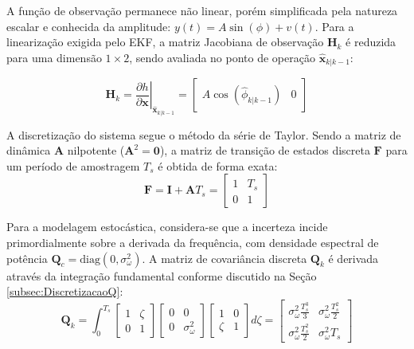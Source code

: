 \documentclass[a4paper,12pt]{article}
\begin{document}
A função de observação permanece não linear, porém simplificada pela natureza escalar e conhecida da amplitude: $y(t) = A\sin(\phi) + v(t)$. Para a linearização exigida pelo EKF, a matriz Jacobiana de observação $\mathbf{H}_k$ é reduzida para uma dimensão $1 \times 2$, sendo avaliada no ponto de operação $\hat{\mathbf{x}}_{k|k-1}$:

\begin{equation}
    \mathbf{H}_k = \left. \frac{\partial h}{\partial \mathbf{x}} \right|_{\hat{\mathbf{x}}_{k|k-1}} = \begin{bmatrix} A \cos(\hat{\phi}_{k|k-1}) & 0 \end{bmatrix}
    \label{eq:mod3_H_jacobiana}
\end{equation}

A discretização do sistema segue o método da série de Taylor. Sendo a matriz de dinâmica $\mathbf{A}$ nilpotente ($\mathbf{A}^2 = \mathbf{0}$), a matriz de transição de estados discreta $\mathbf{F}$ para um período de amostragem $T_s$ é obtida de forma exata:
\begin{equation}
    \mathbf{F} = \mathbf{I} + \mathbf{A}T_s = \begin{bmatrix} 1 & T_s \\ 0 & 1 \end{bmatrix}
    \label{eq:mod3_F_discreta}
\end{equation}

Para a modelagem estocástica, considera-se que a incerteza incide primordialmente sobre a derivada da frequência, com densidade espectral de potência $\mathbf{Q}_c = \text{diag}(0, \sigma_{\omega}^2)$. A matriz de covariância discreta $\mathbf{Q}_k$ é derivada através da integração fundamental conforme discutido na Seção \ref{subsec:DiscretizacaoQ}:
\begin{equation}
    \mathbf{Q}_k = \int_{0}^{T_s} \begin{bmatrix} 1 & \zeta \\ 0 & 1 \end{bmatrix} \begin{bmatrix} 0 & 0 \\ 0 & \sigma_{\omega}^2 \end{bmatrix} \begin{bmatrix} 1 & 0 \\ \zeta & 1 \end{bmatrix} d\zeta = \begin{bmatrix} \sigma_{\omega}^2 \frac{T_s^3}{3} & \sigma_{\omega}^2 \frac{T_s^2}{2} \\ \sigma_{\omega}^2 \frac{T_s^2}{2} & \sigma_{\omega}^2 T_s \end{bmatrix}
    \label{eq:mod3_Qk_final}
\end{equation}
\end{document}
